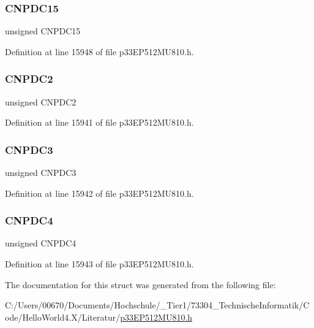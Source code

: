 \subsubsection{\texorpdfstring{C\+N\+P\+D\+C15}{CNPDC15}}
{\footnotesize\ttfamily unsigned C\+N\+P\+D\+C15}



Definition at line 15948 of file p33\+E\+P512\+M\+U810.\+h.

\mbox{\label{structtag_c_n_p_d_c_b_i_t_s_aa31497c6c511495c915f7cd0d80cf73d}} 
\subsubsection{\texorpdfstring{C\+N\+P\+D\+C2}{CNPDC2}}
{\footnotesize\ttfamily unsigned C\+N\+P\+D\+C2}



Definition at line 15941 of file p33\+E\+P512\+M\+U810.\+h.

\mbox{\label{structtag_c_n_p_d_c_b_i_t_s_a370e1e317f15954d3dede4990927aa7d}} 
\subsubsection{\texorpdfstring{C\+N\+P\+D\+C3}{CNPDC3}}
{\footnotesize\ttfamily unsigned C\+N\+P\+D\+C3}



Definition at line 15942 of file p33\+E\+P512\+M\+U810.\+h.

\mbox{\label{structtag_c_n_p_d_c_b_i_t_s_a0af791c444ef107e444978aac227ad3c}} 
\subsubsection{\texorpdfstring{C\+N\+P\+D\+C4}{CNPDC4}}
{\footnotesize\ttfamily unsigned C\+N\+P\+D\+C4}



Definition at line 15943 of file p33\+E\+P512\+M\+U810.\+h.



The documentation for this struct was generated from the following file\+:\begin{DoxyCompactItemize}
\item 
C\+:/\+Users/00670/\+Documents/\+Hochschule/\+\_\+\+Tier1/73304\+\_\+\+Technische\+Informatik/\+Code/\+Hello\+World4.\+X/\+Literatur/\hyperlink{p33_e_p512_m_u810_8h}{p33\+E\+P512\+M\+U810.\+h}\end{DoxyCompactItemize}
